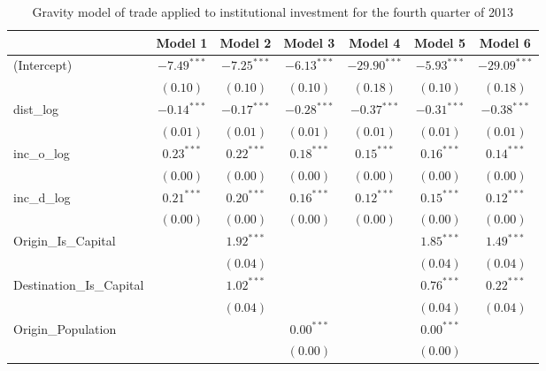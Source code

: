 \begin{table}
	\small
	\begin{center}
		\caption[Gravity Model of Trade for Q4 2013]{Gravity model of trade applied to institutional investment for the fourth quarter of 2013}
		\begin{tabular}{l c c c c c c }
\hline
& Model 1 & Model 2 & Model 3 & Model 4 & Model 5 & Model 6 \\
\hline
(Intercept)                  & $-7.49^{***}$ & $-7.25^{***}$ & $-6.13^{***}$ & $-29.90^{***}$ & $-5.93^{***}$ & $-29.09^{***}$ \\
& $(0.10)$      & $(0.10)$      & $(0.10)$      & $(0.18)$       & $(0.10)$      & $(0.18)$       \\
dist\_log                    & $-0.14^{***}$ & $-0.17^{***}$ & $-0.28^{***}$ & $-0.37^{***}$  & $-0.31^{***}$ & $-0.38^{***}$  \\
& $(0.01)$      & $(0.01)$      & $(0.01)$      & $(0.01)$       & $(0.01)$      & $(0.01)$       \\
inc\_o\_log                  & $0.23^{***}$  & $0.22^{***}$  & $0.18^{***}$  & $0.15^{***}$   & $0.16^{***}$  & $0.14^{***}$   \\
& $(0.00)$      & $(0.00)$      & $(0.00)$      & $(0.00)$       & $(0.00)$      & $(0.00)$       \\
inc\_d\_log                  & $0.21^{***}$  & $0.20^{***}$  & $0.16^{***}$  & $0.12^{***}$   & $0.15^{***}$  & $0.12^{***}$   \\
& $(0.00)$      & $(0.00)$      & $(0.00)$      & $(0.00)$       & $(0.00)$      & $(0.00)$       \\
Origin\_Is\_Capital          &               & $1.92^{***}$  &               &                & $1.85^{***}$  & $1.49^{***}$   \\
&               & $(0.04)$      &               &                & $(0.04)$      & $(0.04)$       \\
Destination\_Is\_Capital     &               & $1.02^{***}$  &               &                & $0.76^{***}$  & $0.22^{***}$   \\
&               & $(0.04)$      &               &                & $(0.04)$      & $(0.04)$       \\
Origin\_Population           &               &               & $0.00^{***}$  &                & $0.00^{***}$  &                \\
&               &               & $(0.00)$      &                & $(0.00)$      &                \\

\end{tabular}
\end{center}
\end{table}

